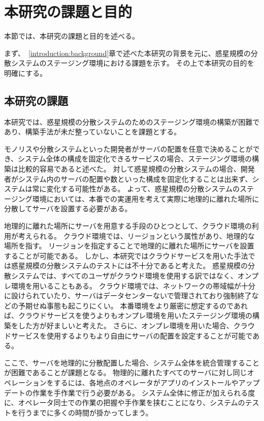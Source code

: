 \section{本研究の課題と目的}
\label{introduction:issue-aim}

本節では、本研究の課題と目的を述べる。

まず、~\ref{introduction:background}章で述べた本研究の背景を元に、惑星規模の分散システムのステージング環境における課題を示す。
その上で本研究の目的を明確にする。

\subsection{本研究の課題}
\label{introduction:issue-aim:issue}

本研究では、惑星規模の分散システムのためのステージング環境の構築が困難であり、構築手法が未だ整っていないことを課題とする。

モノリスや分散システムといった開発者がサーバの配置を任意で決めることができ、システム全体の構成を固定化できるサービスの場合、ステージング環境の構築は比較的容易であると述べた。
対して惑星規模の分散システムの場合、開発者がシステム内のサーバの配置や数といった構成を固定化することは出来ず、システムは常に変化する可能性がある。
よって、惑星規模の分散システムのステージング環境においては、本番での実運用を考えて実際に地理的に離れた場所に分散してサーバを設置する必要がある。

地理的に離れた場所にサーバを用意する手段のひとつとして、クラウド環境の利用が考えられる。
クラウド環境では、リージョンという属性があり、地理的な場所を指す。
リージョンを指定することで地理的に離れた場所にサーバを設置することが可能である。
しかし、本研究ではクラウドサービスを用いた手法では惑星規模の分散システムのテストには不十分であると考えた。
惑星規模の分散システムでは、すべてのユーザがクラウド環境を使用する訳ではなく、オンプレ環境を用いることもある。
クラウド環境では、ネットワークの帯域幅が十分に設けられていたり、サーバはデータセンターないで管理されており強制終了などの予期せぬ事態も起こりにくい。
本番環境をより厳密に想定するのであれば、クラウドサービスを使うよりもオンプレ環境を用いたステージング環境の構築をした方が好ましいと考えた。
さらに、オンプレ環境を用いた場合、クラウドサービスを使用するよりもより自由にサーバの配置を設定することが可能である。

ここで、サーバを地理的に分散配置した場合、システム全体を統合管理することが困難であることが課題となる。
物理的に離れたすべてのサーバに対し同じオペレーションをするには、各地点のオペレータがアプリのインストールやアップデートの作業を手作業で行う必要がある。
システム全体に修正が加えられる度に、オペレータ同士での作業の把握や手作業を挟むことになり、システムのテストを行うまでに多くの時間が掛かってしまう。

